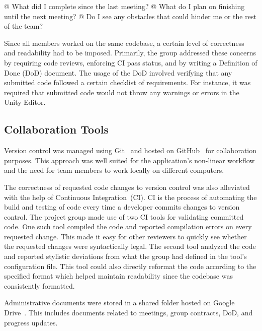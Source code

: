 \begin{easylist}
  @ What did I complete since the last meeting?
  @ What do I plan on finishing until the next meeting?
  @ Do I see any obstacles that could hinder me or the rest of the team?
\end{easylist}

Since all members worked on the same codebase, a certain level of correctness and readability had to be imposed.
Primarily, the group addressed these concerns by requiring code reviews, enforcing CI pass status, and by writing a Definition of Done (DoD) document.
The usage of the DoD involved verifying that any submitted code followed a certain checklist of requirements.
For instance, it was required that submitted code would not throw any warnings or errors in the Unity Editor. 

\subsection{Collaboration Tools}
Version control was managed using Git~\cite{git} and hosted on GitHub~\cite{github} for collaboration purposes.
This approach was well suited for the application's non-linear workflow and the need for team members to work locally on different computers.

The correctness of requested code changes to version control was also alleviated with the help of Continuous Integration~(CI).
CI is the process of automating the build and testing of code every time a developer commits changes to version control.
The project group made use of two CI tools for validating committed code.
One such tool compiled the code and reported compilation errors on every requested change.
This made it easy for other reviewers to quickly see whether the requested changes were syntactically legal.
The second tool analyzed the code and reported stylistic deviations from what the group had defined in the tool's configuration file.
This tool could also directly reformat the code according to the specified format which helped maintain readability since the codebase was consistently formatted.

Administrative documents were stored in a shared folder hosted on Google Drive~\cite{google_drive}.
This includes documents related to meetings, group contracts, DoD, and progress updates.

